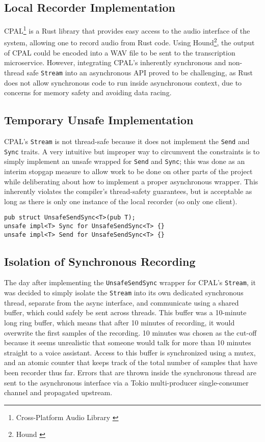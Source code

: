 \subsection{Local Recorder Implementation}
CPAL\footnote{Cross-Platform Audio Library \cite{cpal}} is a Rust library that provides easy access to the audio interface of the system,
allowing one to record audio from Rust code. Using Hound\footnote{Hound \cite{hound}}, the output of CPAL could be encoded into a WAV file
to be sent to the transcription microservice. However, integrating CPAL's inherently synchronous and non-thread safe \texttt{Stream} into an asynchronous API
proved to be challenging, as Rust does not allow synchronous code to run inside asynchronous context, due to concerns for memory safety and avoiding data racing.

\subsection{Temporary Unsafe Implementation}
CPAL's \texttt{Stream} is not thread-safe because it does not implement the \texttt{Send} and \texttt{Sync} traits.
A very intuitive but improper way to circumvent the constraints is to simply implement an unsafe wrapped for \texttt{Send} and \texttt{Sync};
this was done as an interim stopgap measure to allow work to be done on other parts of the project while deliberating about how to implement a proper asynchronous wrapper.
This inherently violates the compiler's thread-safety guarantees, but is acceptable as long as there is only one instance of the local recorder (so only one client).

\begin{verbatim}
pub struct UnsafeSendSync<T>(pub T);
unsafe impl<T> Sync for UnsafeSendSync<T> {}
unsafe impl<T> Send for UnsafeSendSync<T> {}
\end{verbatim}

\subsection{Isolation of Synchronous Recording}
The day after implementing the \texttt{UnsafeSendSync} wrapper for CPAL's \texttt{Stream}, it was decided to simply isolate the \texttt{Stream}
into its own dedicated synchronous thread, separate from the async interface, and communicate using a shared buffer, which could safely be sent across threads. 
This buffer was a 10-minute long ring buffer, which means that after 10 minutes of recording, it would overwrite the first samples of the recording.
10 minutes was chosen as the cut-off because it seems unrealistic that someone would talk for more than 10 minutes straight to a voice assistant.
Access to this buffer is synchronized using a mutex, and an atomic counter that keeps track of the total number of samples that have been recorder thus far.
Errors that are thrown inside the synchronous thread are sent to the asynchronous interface via a Tokio multi-producer single-consumer channel and propagated upstream.

